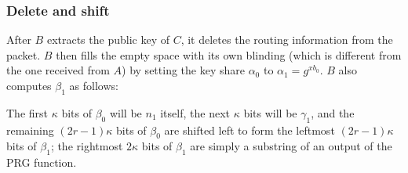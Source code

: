 \subsubsection{Delete and shift}
\label{sec:sphinx:shifting}

After $B$ extracts the public key of $C$, it deletes the routing information from the packet. $B$ then fills the empty space with its own blinding (which is different from the one received from $A$) by setting the key share $\alpha_0$ to $\alpha_1=g^{xb_0}$. $B$ also computes $\beta_1$ as follows:

The first $\kappa$ bits of $\beta_0$ will be $n_{1}$ itself, the next $\kappa$ bits will be $\gamma_{1}$, and the remaining $(2r-1)\kappa$ bits of $\beta_0$ are shifted left to form the leftmost $(2r-1)\kappa$ bits of $\beta_{1}$; the rightmost $2\kappa$ bits of $\beta_{1}$ are simply a substring of an output of the PRG function.

